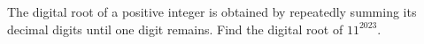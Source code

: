 The digital root of a positive integer is obtained by repeatedly summing its decimal digits until one digit remains. Find the digital root of $11^{2023}$.
